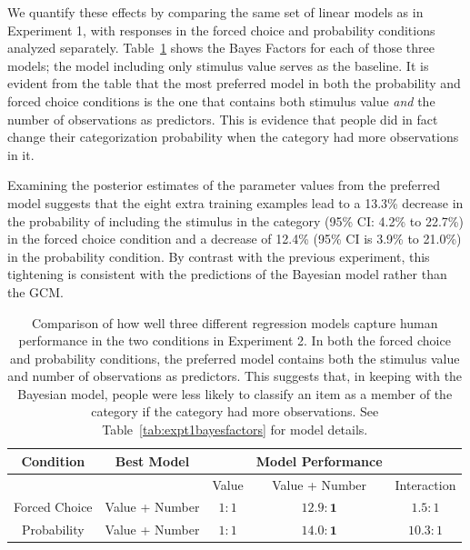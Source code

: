 \documentclass[doc,apacite]{apa6}
\begin{document}
We quantify these effects by comparing the same set of linear models as in Experiment 1, with responses in the {\sc forced choice} and {\sc probability} conditions analyzed separately.
Table~\ref{tab:expt2bayesfactors} shows the Bayes Factors for each of those three models; the model including only stimulus value serves as the baseline. It is evident from the table that the most preferred model in both the {\sc probability} and {\sc forced choice} conditions is the one that contains both stimulus value {\it and} the number of observations as predictors. This is evidence that people did in fact change their categorization probability when the category had more observations in it. 

Examining the posterior estimates of the parameter values from the preferred model suggests that the eight extra training examples lead to a 13.3\% decrease in the probability of including the stimulus in the category
(95\% CI: 4.2\% to 22.7\%) in the {\sc forced choice} condition and a decrease of 12.4\% (95\% CI is 3.9\% to 21.0\%) in the {\sc probability} condition. By contrast with the previous experiment, this tightening is consistent with the predictions of the Bayesian model rather than the GCM. 


\begin{table}[t]
  \centering
  \begin{tabular}{ccccc} %
    \toprule
    Condition & Best Model & & Model Performance & \\
    \midrule
    & & Value & Value + Number & Interaction \\
    \midrule
    Forced Choice & Value + Number & $ 1 : 1 $ & $ \mathbf{12.9 : 1} $ & $ 1.5 : 1 $ \\
    Probability & Value + Number & $ 1 : 1 $ & $ \mathbf{14.0 : 1} $ & $ 10.3 : 1 $ \\
    \bottomrule
  \end{tabular}
  \caption{Comparison of how well three different regression models capture human performance in the two  conditions in Experiment 2. In both the {\sc forced choice} and {\sc probability} conditions, the preferred model contains both the stimulus value and number of observations as predictors. This suggests that, in keeping with the Bayesian model, people were less likely to classify an item as a member of the category if the category had more observations. See Table~\ref{tab:expt1bayesfactors} for model details.}
  \label{tab:expt2bayesfactors}
\end{table}
\end{document}
